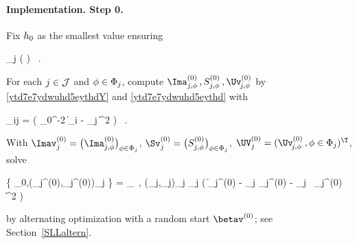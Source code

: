 \paragraph{Implementation. Step 0.}
Fix \( h_{0} \) as the smallest value ensuring
\begin{EQA}[c]
	 \sum_{j \in \JJJ} 
	\sumi \Kern\Bigl(  \Bigr)
	\geq 
	\nmin
	\, .
\end{EQA}
\begin{mylist}

\item 
For each \( j \in \mathcal{J} \) and \( \phi \in \Phi_{j} \), 
compute \( \Ima_{j,\sph}^{(0)} \, , S_{j,\sph}^{(0)} \, , \Uv_{\jm,\sph}^{(0)} \) by \eqref{ytd7e7ydwuhd5eythdY} and \eqref{ytd7e7ydwuhd5eythd}
with 
\begin{EQA}[c]
	\weight_{ij} = \Kern\bigl( \hiso_{0}^{-2} \| \Xv_{i} - \xv_{j} \|^{2} \bigr) 
	\, .
\end{EQA}
\item 
With 
\( \Imav_{j}^{(0)} = \bigl( \Ima_{j,\sph}^{(0)} \bigr)_{\sph \in \Sph_{j}} \),
\( \Sv_{j}^{(0)} = \bigl( S_{j,\sph}^{(0)} \bigr)_{\sph \in \Sph_{j}} \),
\( \UV_{j}^{(0)} = (\Uv_{\jm,\sph}^{(0)} \, , \sph \in \Sph_{j})^{\T} \),
solve
\begin{EQA}[c]
	\bigl\{ \betav_{0},(\fcn_{j}^{(0)},\fcl_{j}^{(0)})_{j \in \JJJ} \bigr\}
	=
	\arginf_{\betav \, , (\fcn_{j},\fclv_{j})_{j \in \JJJ}}
	\sum_{j \in \JJJ} \Bigl( \| \Imav_{j}^{(0)} - \fcn_{j} \Sv_{j}^{(0)} - \fcl_{j} \, \UV_{j}^{(0)} \betav \bigr\|^{2} \Bigr) 
	\, 
	\qquad
\end{EQA}
by alternating optimization with a random start \( \betav^{(0)} \); see Section~\ref{SLLaltern}.

\end{mylist}

